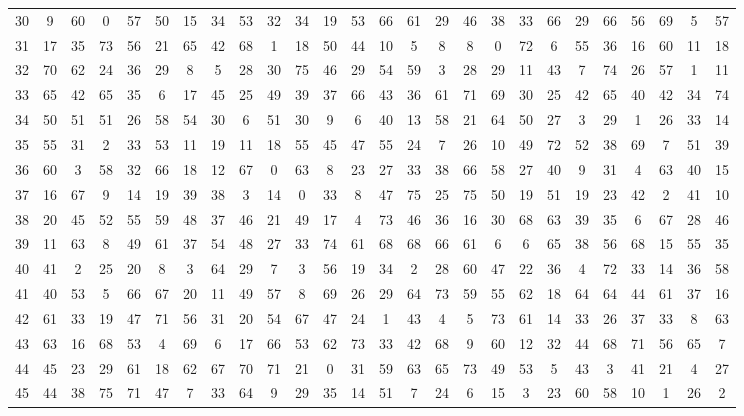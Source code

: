 \begin{table}
\begin{tabular}{c c c c c c c c c c c c c c c c c c c c c c c c c c }
30 & 9 & 60 & 0 & 57 & 50 & 15 & 34 & 53 & 32 & 34 & 19 & 53 & 66 & 61 & 29 & 46 & 38 & 33 & 66 & 29 & 66 & 56 & 69 & 5 & 57 \\
31 & 17 & 35 & 73 & 56 & 21 & 65 & 42 & 68 & 1 & 18 & 50 & 44 & 10 & 5 & 8 & 8 & 0 & 72 & 6 & 55 & 36 & 16 & 60 & 11 & 18 \\
32 & 70 & 62 & 24 & 36 & 29 & 8 & 5 & 28 & 30 & 75 & 46 & 29 & 54 & 59 & 3 & 28 & 29 & 11 & 43 & 7 & 74 & 26 & 57 & 1 & 11 \\
33 & 65 & 42 & 65 & 35 & 6 & 17 & 45 & 25 & 49 & 39 & 37 & 66 & 43 & 36 & 61 & 71 & 69 & 30 & 25 & 42 & 65 & 40 & 42 & 34 & 74 \\
34 & 50 & 51 & 51 & 26 & 58 & 54 & 30 & 6 & 51 & 30 & 9 & 6 & 40 & 13 & 58 & 21 & 64 & 50 & 27 & 3 & 29 & 1 & 26 & 33 & 14 \\
35 & 55 & 31 & 2 & 33 & 53 & 11 & 19 & 11 & 18 & 55 & 45 & 47 & 55 & 24 & 7 & 26 & 10 & 49 & 72 & 52 & 38 & 69 & 7 & 51 & 39 \\
36 & 60 & 3 & 58 & 32 & 66 & 18 & 12 & 67 & 0 & 63 & 8 & 23 & 27 & 33 & 38 & 66 & 58 & 27 & 40 & 9 & 31 & 4 & 63 & 40 & 15 \\
37 & 16 & 67 & 9 & 14 & 19 & 39 & 38 & 3 & 14 & 0 & 33 & 8 & 47 & 75 & 25 & 75 & 50 & 19 & 51 & 19 & 23 & 42 & 2 & 41 & 10 \\
38 & 20 & 45 & 52 & 55 & 59 & 48 & 37 & 46 & 21 & 49 & 17 & 4 & 73 & 46 & 36 & 16 & 30 & 68 & 63 & 39 & 35 & 6 & 67 & 28 & 46 \\
39 & 11 & 63 & 8 & 49 & 61 & 37 & 54 & 48 & 27 & 33 & 74 & 61 & 68 & 68 & 66 & 61 & 6 & 6 & 65 & 38 & 56 & 68 & 15 & 55 & 35 \\
40 & 41 & 2 & 25 & 20 & 8 & 3 & 64 & 29 & 7 & 3 & 56 & 19 & 34 & 2 & 28 & 60 & 47 & 22 & 36 & 4 & 72 & 33 & 14 & 36 & 58 \\
41 & 40 & 53 & 5 & 66 & 67 & 20 & 11 & 49 & 57 & 8 & 69 & 26 & 29 & 64 & 73 & 59 & 55 & 62 & 18 & 64 & 64 & 44 & 61 & 37 & 16 \\
42 & 61 & 33 & 19 & 47 & 71 & 56 & 31 & 20 & 54 & 67 & 47 & 24 & 1 & 43 & 4 & 5 & 73 & 61 & 14 & 33 & 26 & 37 & 33 & 8 & 63 \\
43 & 63 & 16 & 68 & 53 & 4 & 69 & 6 & 17 & 66 & 53 & 62 & 73 & 33 & 42 & 68 & 9 & 60 & 12 & 32 & 44 & 68 & 71 & 56 & 65 & 7 \\
44 & 45 & 23 & 29 & 61 & 18 & 62 & 67 & 70 & 71 & 21 & 0 & 31 & 59 & 63 & 65 & 73 & 49 & 53 & 5 & 43 & 3 & 41 & 21 & 4 & 27 \\
45 & 44 & 38 & 75 & 71 & 47 & 7 & 33 & 64 & 9 & 29 & 35 & 14 & 51 & 7 & 24 & 6 & 15 & 3 & 23 & 60 & 58 & 10 & 1 & 26 & 2 \\

\end{tabular}
\end{table}
